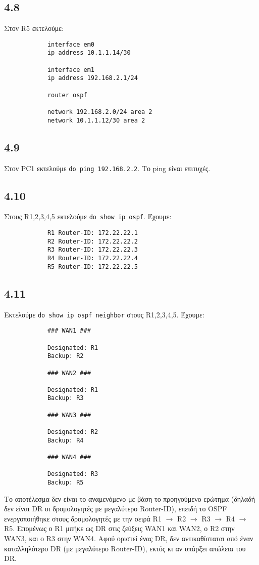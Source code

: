 \documentclass[a4paper, 12pt]{article}
\begin{document}
	\subsection*{4.8}
		Στον R5 εκτελούμε:
		
		\begin{verbatim}
			interface em0
			ip address 10.1.1.14/30
			
			interface em1
			ip address 192.168.2.1/24
			
			router ospf
			
			network 192.168.2.0/24 area 2 
			network 10.1.1.12/30 area 2
		\end{verbatim}

	\subsection*{4.9}
		Στον PC1 εκτελούμε \verb|do ping 192.168.2.2|. Το ping είναι επιτυχές.

	\subsection*{4.10}
		Στους R1,2,3,4,5 εκτελούμε \verb|do show ip ospf|. Έχουμε:
		
		\begin{verbatim}
			R1 Router-ID: 172.22.22.1
			R2 Router-ID: 172.22.22.2
			R3 Router-ID: 172.22.22.3
			R4 Router-ID: 172.22.22.4
			R5 Router-ID: 172.22.22.5
		\end{verbatim}

	\subsection*{4.11}
		Εκτελούμε \verb|do show ip ospf neighbor| στους R1,2,3,4,5. Έχουμε:
		
		\begin{verbatim}
			### WAN1 ###      
			
			Designated: R1
			Backup: R2
			
			### WAN2 ###
			
			Designated: R1 
			Backup: R3
			
			### WAN3 ###
			
			Designated: R2
			Backup: R4
			
			### WAN4 ###
			
			Designated: R3
			Backup: R5
		\end{verbatim}
	
		Το αποτέλεσμα δεν είναι το αναμενόμενο με βάση το προηγούμενο ερώτημα (δηλαδή δεν είναι DR οι δρομολογητές με μεγαλύτερο Router-ID), επειδή το OSPF ενεργοποιήθηκε στους δρομολογητές με την σειρά R1 $\rightarrow$ R2 $\rightarrow$ R3 $\rightarrow$ R4 $\rightarrow$ R5. Επομένως ο R1 μπήκε ως DR στις ζεύξεις WAN1 και WAN2, ο R2 στην WAN3, και ο R3 στην WAN4. Αφού οριστεί ένας DR, δεν αντικαθίσταται από έναν καταλληλότερο DR (με μεγαλύτερο Router-ID), εκτός κι αν υπάρξει απώλεια του DR. 
		
\end{document}
